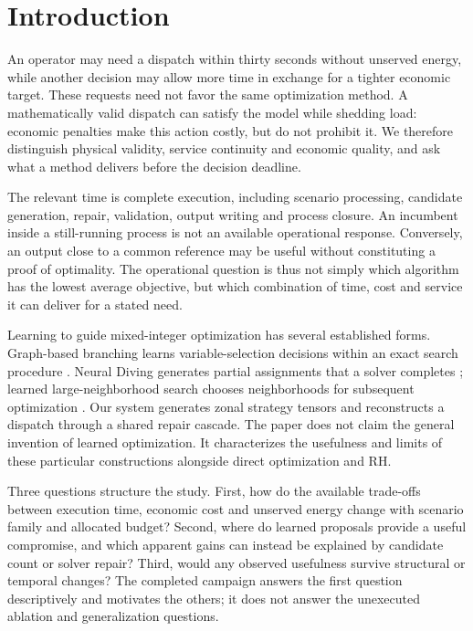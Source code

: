 \section{Introduction}
An operator may need a dispatch within thirty seconds without unserved energy,
while another decision may allow more time in exchange for a tighter economic
target. These requests need not favor the same optimization method. A
mathematically valid dispatch can satisfy the model while shedding load:
economic penalties make this action costly, but do not prohibit it. We
therefore distinguish physical validity, service continuity and economic
quality, and ask what a method delivers before the decision deadline.

The relevant time is complete execution, including scenario processing,
candidate generation, repair, validation, output writing and process closure.
An incumbent inside a still-running process is not an available operational
response. Conversely, an output close to a common reference may be useful
without constituting a proof of optimality. The operational question is thus
not simply which algorithm has the lowest average objective, but which
combination of time, cost and service it can deliver for a stated need.

Learning to guide mixed-integer optimization has several established forms.
Graph-based branching learns variable-selection decisions within an exact
search procedure \citep{gasse2019}. Neural Diving generates partial assignments
that a solver completes \citep{nair2021}; learned large-neighborhood search
chooses neighborhoods for subsequent optimization \citep{sonnerat2022}.
Our system generates zonal strategy tensors and reconstructs a dispatch
through a shared repair cascade. The paper does not claim the general
invention of learned optimization. It characterizes the usefulness and limits
of these particular constructions alongside direct optimization and RH.

Three questions structure the study. First, how do the available trade-offs
between execution time, economic cost and unserved energy change with scenario
family and allocated budget? Second, where do learned proposals provide a
useful compromise, and which apparent gains can instead be explained by
candidate count or solver repair? Third, would any observed usefulness survive
structural or temporal changes? The completed campaign answers the first
question descriptively and motivates the others; it does not answer the
unexecuted ablation and generalization questions.

